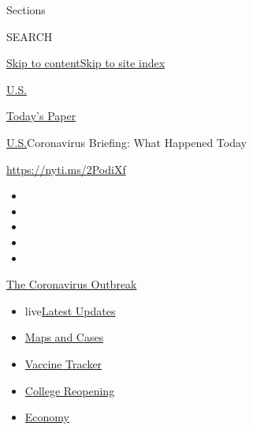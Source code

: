 Sections

SEARCH

\protect\hyperlink{site-content}{Skip to
content}\protect\hyperlink{site-index}{Skip to site index}

\href{https://www.nytimes.com/section/us}{U.S.}

\href{https://myaccount.nytimes.com/auth/login?response_type=cookie\&client_id=vi}{}

\href{https://www.nytimes.com/section/todayspaper}{Today's Paper}

\href{/section/us}{U.S.}\textbar{}Coronavirus Briefing: What Happened
Today

\url{https://nyti.ms/2PodiXf}

\begin{itemize}
\item
\item
\item
\item
\item
\end{itemize}

\href{https://www.nytimes.com/news-event/coronavirus?action=click\&pgtype=Article\&state=default\&region=TOP_BANNER\&context=storylines_menu}{The
Coronavirus Outbreak}

\begin{itemize}
\tightlist
\item
  live\href{https://www.nytimes.com/2020/08/04/world/coronavirus-cases.html?action=click\&pgtype=Article\&state=default\&region=TOP_BANNER\&context=storylines_menu}{Latest
  Updates}
\item
  \href{https://www.nytimes.com/interactive/2020/us/coronavirus-us-cases.html?action=click\&pgtype=Article\&state=default\&region=TOP_BANNER\&context=storylines_menu}{Maps
  and Cases}
\item
  \href{https://www.nytimes.com/interactive/2020/science/coronavirus-vaccine-tracker.html?action=click\&pgtype=Article\&state=default\&region=TOP_BANNER\&context=storylines_menu}{Vaccine
  Tracker}
\item
  \href{https://www.nytimes.com/2020/08/02/us/covid-college-reopening.html?action=click\&pgtype=Article\&state=default\&region=TOP_BANNER\&context=storylines_menu}{College
  Reopening}
\item
  \href{https://www.nytimes.com/live/2020/08/04/business/stock-market-today-coronavirus?action=click\&pgtype=Article\&state=default\&region=TOP_BANNER\&context=storylines_menu}{Economy}
\end{itemize}

